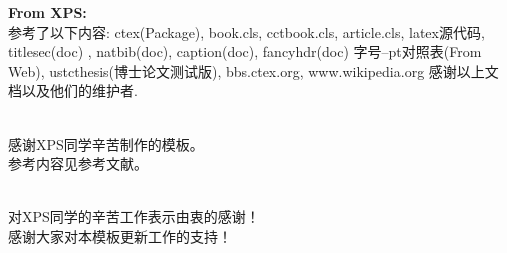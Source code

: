 
\begin{thankspage}
\noindent
{\bfseries From XPS:}\\
参考了以下内容:
ctex(Package), book.cls, cctbook.cls, article.cls, latex源代码, titlesec(doc)
, natbib(doc), caption(doc), fancyhdr(doc) 字号--pt对照表(From Web),
ustcthesis(博士论文测试版), bbs.ctex.org, www.wikipedia.org
感谢以上文档以及他们的维护者.

\\
感谢XPS同学辛苦制作的模板。\\
参考内容见参考文献。

\\
对XPS同学的辛苦工作表示由衷的感谢！\\
感谢大家对本模板更新工作的支持！

\end{thankspage}
